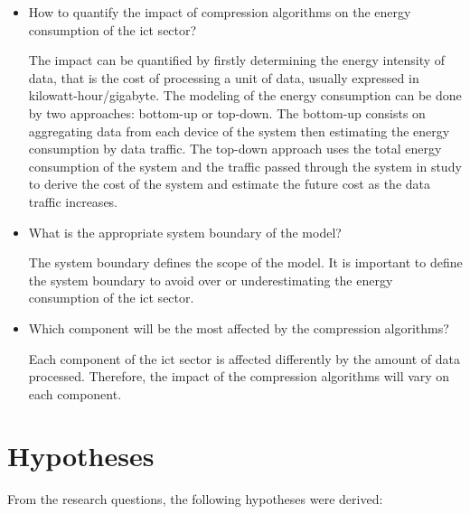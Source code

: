 \begin{itemize}
    \item How to quantify the impact of compression algorithms on the energy consumption of the \ac{ict} sector?

    The impact can be quantified by firstly determining the energy intensity of data, that is the cost of processing a unit of data, usually expressed in \ac{kilowatt-hour}/\ac{gigabyte}.
    The modeling of the energy consumption can be done by two approaches: bottom-up or top-down. 
    The bottom-up consists on aggregating data from each device of the system then estimating the energy consumption by data traffic.
    The top-down approach uses the total energy consumption of the system and the traffic passed through the system in study to derive the cost of the system and estimate the future cost as the data traffic increases.
    
    \item What is the appropriate system boundary of the model?
    
    The system boundary defines the scope of the model. It is important to define the system boundary to avoid over or underestimating the energy consumption of the \ac{ict} sector.

    \item Which component will be the most affected by the compression algorithms?

    Each component of the \ac{ict} sector is affected differently by the amount of data processed. Therefore, the impact of the compression algorithms will vary on each component.
\end{itemize}

\section{Hypotheses}
\label{section:hypotheses}

From the research questions, the following hypotheses were derived:

